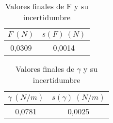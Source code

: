 \documentclass[10pt,a4paper]{article}
\begin{document}
\begin{table}[h!] %
\begin{center}
\begin{tabular}{|c|c|}
\hline
$F \ (N)$ &  $s(F) \ (N)$ \\ \hline
0,0309 & 0,0014 \\ \hline
\end{tabular}
\caption{Valores finales de F y su incertidumbre}
\label{tab:valores finales F a temperatura ambiente}
\end{center}
\end{table} 

\begin{table}[h!] %
\begin{center}
\begin{tabular}{|c|c|}
\hline
$\gamma  \ (N/m)$ &  $s(\gamma) \ (N/m)$ \\ \hline
0,0781 & 0,0025 \\ \hline
\end{tabular}
\caption{Valores finales de $\gamma$ y su incertidumbre}

\label{tab:valores finales F a temperatura ambiente}
\end{center}
\end{table} 
\end{document}

